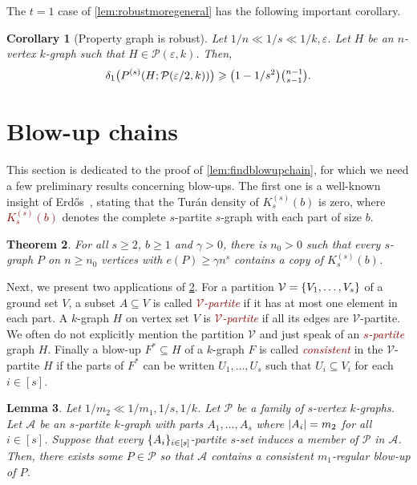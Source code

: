 \documentclass[12pt,reqno]{amsart}
\theoremstyle{plain}
\newtheorem{theorem}{Theorem}[section]
\newtheorem{corollary}[theorem]{Corollary}
\newtheorem{lemma}[theorem]{Lemma}
\theoremstyle{definition}
\numberwithin{equation}{section}
\DeclarePairedDelimiter{\abs}{\lvert}{\rvert}
\DeclarePairedDelimiter{\set}{\{}{\}}
\renewcommand{\geq}{\geqslant}
\renewcommand{\subset}{\subseteq}
\newcommand{\defn}[1]{\textcolor{Maroon}{\emph{#1}}}
\newcommand{\eps}{\varepsilon}
\newcommand{\PG}[3]{{P^{(#3)}}(#1;#2)}
\newcommand{\cA}{\mathcal{A}}
\newcommand{\cP}{\mathcal{P}}
\newcommand{\cV}{\mathcal{V}}
\begin{document}
	The $t=1$ case of \cref{lem:robustmoregeneral} has the following important corollary.
	
	\begin{corollary}[Property graph is robust]\label{cor:propgraphrobust}
		Let $1/n\ll 1/s \ll 1/k, \eps$. Let $H$ be an $n$-vertex $k$-graph such that $H\in \cP(\eps,k)$. Then,
		\begin{equation*}
			\delta_1 \bigl(\PG{H}{ \cP(\eps/2,k) }{s} \bigr) \geq \bigl(1-1/s^2 \bigr) \tbinom{n-1}{s-1}.
		\end{equation*}
	\end{corollary}
	
	
	\section{Blow-up chains}\label{sec:blow-up}
	
	This section is dedicated to the proof of \cref{lem:findblowupchain}, for which we need a few preliminary results concerning blow-ups. The first one is a well-known insight of Erd\H{o}s~\cite{Erdos1964hypextremal}, stating that the Tur\'an density of $K_s^{(s)}(b)$ is zero, where \defn{$K_s^{(s)}(b)$} denotes the complete $s$-partite $s$-graph with each part of size $b$.
	
	\begin{theorem}
		\label{thm:erd64}
		For all $s\geq 2$, $b \geq 1$ and $\gamma > 0$, there is $n_0>0$ such that every $s$-graph $P$ on $n\geq n_0$ vertices with $e(P) \geq \gamma n^s$ contains a copy of $K_s^{(s)}(b)$.
	\end{theorem}
	
	Next, we present two applications of \cref{thm:erd64}.
	For a partition $\cV = \set{V_1, \dotsc, V_s}$ of a ground set $V$, a subset $A \subset V$ is called \defn{$\cV$-partite} if it has at most one element in each part.
	A $k$-graph $H$ on vertex set $V$ is \defn{$\cV$-partite} if all its edges are $\cV$-partite.
	We often do not explicitly mention the partition $\cV$ and just speak of an \defn{$s$-partite} graph $H$.
	Finally a blow-up $F^\ast \subset H$ of a $k$-graph $F$ is called \defn{consistent} in the $\cV$-partite $H$ if the parts of $F^\ast$ can be written $U_1, \dotsc, U_s$ such that $U_i \subset V_i$ for each $i \in [s]$.
	
	\begin{lemma}\label{lem:pigeonhole}
		Let $1/m_2 \ll 1/m_1, 1/s, 1/k$.
		Let $\cP$ be a family of $s$-vertex $k$-graphs. Let $\cA$ be an $s$-partite $k$-graph with parts $A_1, \dotsc, A_s$ where $\abs{A_i} = m_2$ for all $i\in[s]$. Suppose that every $\set{A_i}_{i \in [s]}$-partite $s$-set induces a member of $\cP$ in $\cA$. Then, there exists some $P \in \cP$ so that $\mathcal{A}$ contains a consistent $m_1$-regular blow-up of $P$.
	\end{lemma}
	
\end{document}
